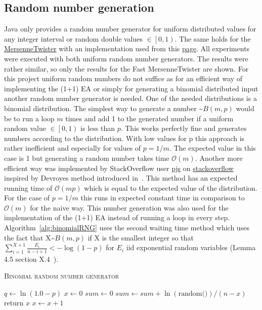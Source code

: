 \subsection{Random number generation}
Java only provides a random number generator for uniform distributed values for any integer interval or random double values $\in \left[0, 1\right)$.
The same holds for the \href{http://www.math.sci.hiroshima-u.ac.jp/m-mat/MT/emt.html}{MersenneTwister} with an implementation used from this \href{https://cs.gmu.edu/~sean/research/}{page}.
All experiments were executed with both uniform random number generators.
The results were rather similar, so only the results for the Fast MersenneTwister are shown.
For this project uniform random numbers do not suffice as for an efficient way of implementing the (1+1) EA or simply for generating a binomial distributed input another random number generator is needed.
One of the needed distributions is a binomial distribution.
The simplest way to generate a number \textasciitilde$B(m,p)$ would be to run a loop $m$ times and add 1 to the generated number if a uniform random value $\in \left[0, 1\right)$ is less than $p$.
This works perfectly fine and generates numbers according to the distribution.
With low values for p this approach is rather inefficient and especially for values of $p=1/m$.
The expected value in this case is 1 but generating a random number takes time $\mathcal{O}(m)$.
Another more efficient way was implemented by StackOverflow user \href{https://stackoverflow.com/users/2166798/pjs}{pjs} on \href{https://stackoverflow.com/questions/23561551/a-efficient-binomial-random-number-generator-code-in-java}{stackoverflow} inspired by Devroyes method introduced in~\cite{devroye2006nonuniform}.
This method has an expected running time of $\mathcal{O}(mp)$ which is equal to the expected value of the distribution.
For the case of $p=1/m$ this runs in expected constant time in comparison to $\mathcal{O}(m)$ for the naive way.
This number generation was also used for the implementation of the (1+1) EA instead of running a loop in every step.
Algorithm~\ref{alg:binomialRNG} uses the second waiting time method which uses the fact that X\textasciitilde$B(m,p)$ if X is the smallest integer so that \(\sum_{i=1}^{X+1}{\frac{E_i}{n-i+1}}<-\log(1-p)\) for $E_i$ iid exponential random variables (Lemma 4.5 section X.4~\cite{devroye2006nonuniform}).

\begin{algorithm}[h]
      \caption{\textsc{Binomial random number generator}}\label{alg:binomialRNG}

      \DontPrintSemicolon%
      $q \leftarrow \ln(1.0 - p)$\;
      $x \leftarrow 0$\;
      $sum \leftarrow 0$\;
      {
      $sum \leftarrow sum +\ln(\text{random()}) / (n - x)$\; \tcp{random() generates a random value $\in \left[0, 1\right)$}
      {
            return $x$\;
      }
      $x \leftarrow x + 1$\;
      }
\end{algorithm}

